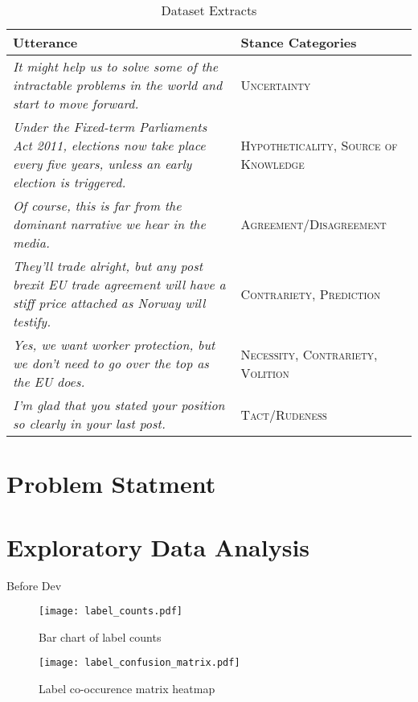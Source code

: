 \documentclass[Dissertation.tex]{subfiles}
\begin{document}
{\renewcommand{\arraystretch}{1.5}
	\centering
\begin{table}
	\begin{tabularx}{\textwidth}{>{\raggedright}X >{\raggedright \arraybackslash}p{5cm}}
		\toprule
		Utterance 											& Stance Categories \\ \midrule
		\itshape It might help us to solve some of the intractable problems in the world and start to move forward. &\small\scshape Uncertainty \\
		\itshape Under the Fixed-term Parliaments Act 2011, elections now take place every five years, unless an early election is triggered. &\small\scshape  Hypotheticality, Source of Knowledge \\
		\itshape Of course, this is far from the dominant narrative we hear in the media. & \small\scshape Agreement/Disagreement \\
		\itshape They’ll trade alright, but any post brexit EU trade agreement will have a stiff price attached as Norway will testify. &\small\scshape  Contrariety, Prediction\\
		\itshape Yes, we want worker protection, but we don’t need to go over the top as the EU does. & \small\scshape Necessity, Contrariety, Volition\\
		\itshape I’m glad that you stated your position so clearly in your last post. &\small\scshape  Tact/Rudeness
		 \\\bottomrule
		
	\end{tabularx}
\caption{Dataset Extracts
\label{tab:dataExtracts}}
\end{table}}
\section{Problem Statment}

\section{Exploratory Data Analysis}
Before Dev


\begin{figure}
	\centering
	\texttt{[image: label\_counts.pdf]}
	\caption{Bar chart of label counts}
\end{figure}

\begin{figure}
	\centering
	\hspace*{1em}
	\texttt{[image: label\_confusion\_matrix.pdf]}
	\caption{Label co-occurence matrix heatmap}
	\label{fig:labCoOc}
\end{figure}
\end{document}
